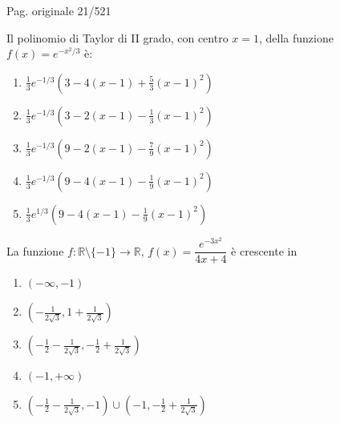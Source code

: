 
\par\noindent\hfill{\color{cyan!65!black}\scriptsize Pag. originale 21/521}\par\smallskip

\begin{quiz}
Il polinomio di Taylor di II grado, con centro $x=1$, della funzione $f(x)=e^{-x^2/3}$ \`e:
\begin{enumerate}[label=\alph*),leftmargin=1.3cm,itemsep=3pt,topsep=5pt]
\item $\frac13e^{-1/3}(3-4(x-1)+\frac53(x-1)^2)$
\item $\frac13e^{-1/3}(3-2(x-1)-\frac13(x-1)^2)$
\item $\frac13e^{-1/3}(9-2(x-1)-\frac79(x-1)^2)$
\item $\frac13e^{-1/3}(9-4(x-1)-\frac19(x-1)^2)$
\item $\frac13e^{1/3}(9-4(x-1)-\frac19(x-1)^2)$
\end{enumerate}
\end{quiz}

\begin{quiz}
La funzione $f:\mathbb R\setminus\{-1\}\to\mathbb R$, $f(x)=\dfrac{e^{-3x^2}}{4x+4}$ \`e crescente in
\begin{enumerate}[label=\alph*),leftmargin=1.3cm,itemsep=3pt,topsep=5pt]
\item $(-\infty,-1)$
\item $(-\frac1{2\sqrt3},1+\frac1{2\sqrt3})$
\item $(-\frac12-\frac1{2\sqrt3},-\frac12+\frac1{2\sqrt3})$
\item $(-1,+\infty)$
\item $(-\frac12-\frac1{2\sqrt3},-1)\cup(-1,-\frac12+\frac1{2\sqrt3})$
\end{enumerate}
\end{quiz}

